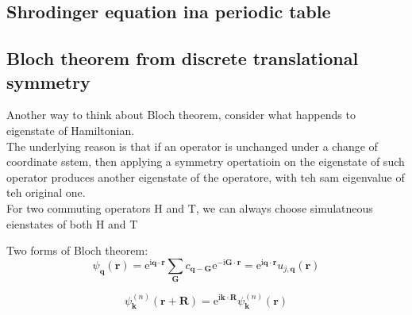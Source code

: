 \documentclass[12pt,a4paper]{article}
\begin{document}
\subsection{Shrodinger equation ina periodic table}
\subsection{Bloch theorem from discrete translational symmetry}
Another way to think about Bloch theorem, consider what happends to eigenstate of Hamiltonian.\\ 

The underlying reason is that if an operator is unchanged under a change of coordinate sstem, then applying a symmetry opertatioin on the eigenstate of such operator produces another eigenstate of the operatore, with teh sam eigenvalue of teh original one.\\

For two commuting operators H and T, we can always choose simulatneous eienstates of both H and T 

Two forms of Bloch theorem:
$$
\psi_{\boldsymbol{q}}(\boldsymbol{r})=\mathrm{e}^{\mathrm{i} \boldsymbol{q} \cdot \boldsymbol{r}} \sum_{\boldsymbol{G}} c_{\boldsymbol{q}-\boldsymbol{G}} \mathrm{e}^{-\mathrm{i} \boldsymbol{G} \cdot \boldsymbol{r}}=\mathrm{e}^{\mathrm{i} \boldsymbol{q} \cdot \boldsymbol{r}} u_{j, \boldsymbol{q}}(\boldsymbol{r})
$$            

$$
\psi_{\boldsymbol{k}}^{(n)}(\boldsymbol{r}+\boldsymbol{R})=\mathrm{e}^{\mathrm{i} \boldsymbol{k} \cdot \boldsymbol{R}} \psi_{\boldsymbol{k}}^{(n)}(\boldsymbol{r})
$$        
    
\end{document}

